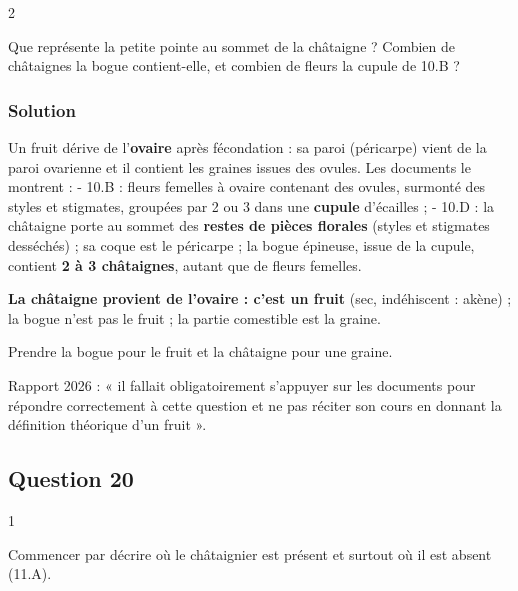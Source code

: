 \documentclass[11pt,a4paper]{article}
\begin{document}
\begin{indication}{2}

Que représente la petite pointe au sommet de la châtaigne ? Combien de châtaignes la bogue contient-elle, et combien de fleurs la cupule de 10.B ?

\end{indication}

\hypertarget{solution-18}{%
\subsubsection{Solution}\label{solution-18}}

Un fruit dérive de l'\textbf{ovaire} après fécondation : sa paroi (péricarpe) vient de la paroi ovarienne et il contient les graines issues des ovules. Les documents le montrent :
- 10.B : fleurs femelles à ovaire contenant des ovules, surmonté des styles et stigmates, groupées par 2 ou 3 dans une \textbf{cupule} d'écailles ;
- 10.D : la châtaigne porte au sommet des \textbf{restes de pièces florales} (styles et stigmates desséchés) ; sa coque est le péricarpe ; la bogue épineuse, issue de la cupule, contient \textbf{2 à 3 châtaignes}, autant que de fleurs femelles.

\textbf{La châtaigne provient de l'ovaire : c'est un fruit} (sec, indéhiscent : akène) ; la bogue n'est pas le fruit ; la partie comestible est la graine.

\begin{piege}

Prendre la bogue pour le fruit et la châtaigne pour une graine.

\end{piege}

\begin{jury}

Rapport 2026 : « il fallait obligatoirement s'appuyer sur les documents pour répondre correctement à cette question et ne pas réciter son cours en donnant la définition théorique d'un fruit ».

\end{jury}

\hypertarget{question-20}{%
\subsection{Question 20}\label{question-20}}

\begin{indication}{1}

Commencer par décrire où le châtaignier est présent et surtout où il est absent (11.A).

\end{indication}
\end{document}
